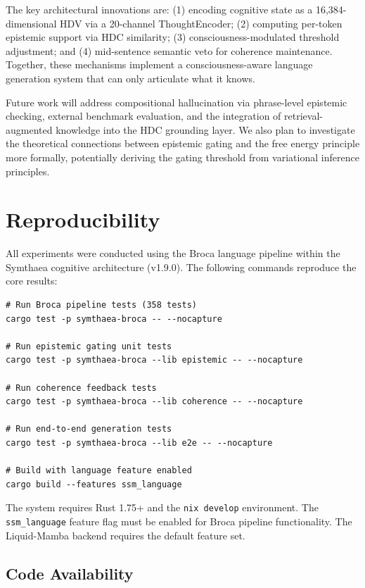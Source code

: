 \documentclass[12pt,a4paper]{article}
\begin{document}
The key architectural innovations are: (1) encoding cognitive state as a 16,384-dimensional HDV via a 20-channel ThoughtEncoder; (2) computing per-token epistemic support via HDC similarity; (3) consciousness-modulated threshold adjustment; and (4) mid-sentence semantic veto for coherence maintenance. Together, these mechanisms implement a consciousness-aware language generation system that can only articulate what it knows.

Future work will address compositional hallucination via phrase-level epistemic checking, external benchmark evaluation, and the integration of retrieval-augmented knowledge into the HDC grounding layer. We also plan to investigate the theoretical connections between epistemic gating and the free energy principle more formally, potentially deriving the gating threshold from variational inference principles.

\section{Reproducibility}

All experiments were conducted using the Broca language pipeline within the Symthaea cognitive architecture (v1.9.0). The following commands reproduce the core results:

\begin{verbatim}
# Run Broca pipeline tests (358 tests)
cargo test -p symthaea-broca -- --nocapture

# Run epistemic gating unit tests
cargo test -p symthaea-broca --lib epistemic -- --nocapture

# Run coherence feedback tests
cargo test -p symthaea-broca --lib coherence -- --nocapture

# Run end-to-end generation tests
cargo test -p symthaea-broca --lib e2e -- --nocapture

# Build with language feature enabled
cargo build --features ssm_language
\end{verbatim}

The system requires Rust 1.75+ and the \texttt{nix develop} environment. The \texttt{ssm\_language} feature flag must be enabled for Broca pipeline functionality. The Liquid-Mamba backend requires the default feature set.

\subsection*{Code Availability}
\end{document}
